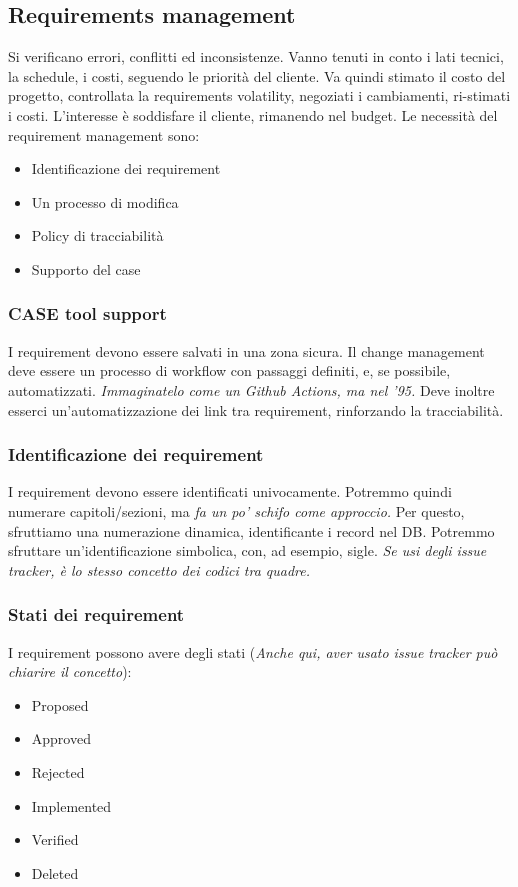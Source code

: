 \documentclass[11pt]{article}
\begin{document}
\subsection{Requirements management}
Si verificano errori, conflitti ed inconsistenze. Vanno tenuti in conto i lati tecnici, la schedule, i costi, seguendo le priorità del cliente. 
Va quindi stimato il costo del progetto, controllata la requirements \gls{volatility}, negoziati i cambiamenti, ri-stimati i costi. L'interesse è soddisfare il cliente, rimanendo nel budget. 
Le necessità del requirement management sono:
\begin{itemize}
    \item Identificazione dei requirement
    \item Un processo di modifica
    \item Policy di tracciabilità
    \item Supporto del \gls{case}
\end{itemize}
\subsubsection{CASE tool support}
I requirement devono essere salvati in una zona sicura. Il change management deve essere un processo di workflow con passaggi definiti, e, se possibile, automatizzati. \textit{Immaginatelo come un Github Actions, ma nel '95.} Deve inoltre esserci un'automatizzazione dei link tra requirement, rinforzando la tracciabilità.
\subsubsection{Identificazione dei requirement}
I requirement devono essere identificati univocamente. Potremmo quindi numerare capitoli/sezioni, ma \textit{fa un po' schifo come approccio.} Per questo, sfruttiamo una numerazione dinamica, identificante i record nel DB. Potremmo sfruttare un'identificazione simbolica, con, ad esempio, sigle. \textit{Se usi degli issue tracker, è lo stesso concetto dei codici tra quadre.}
\subsubsection{Stati dei requirement}
I requirement possono avere degli stati (\textit{Anche qui, aver usato issue tracker può chiarire il concetto}):
\begin{itemize}
    \item Proposed
    \item Approved
    \item Rejected
    \item Implemented
    \item Verified 
    \item Deleted
\end{itemize}
\end{document}
